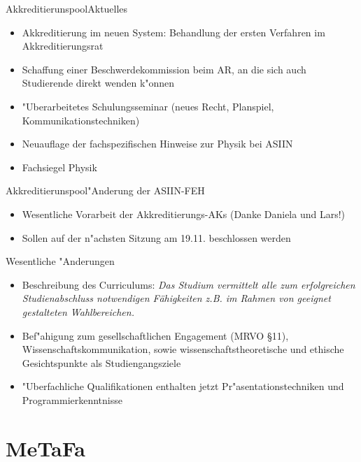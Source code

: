 \documentclass[compress, aspectratio=169]{beamer}
\begin{document}
\begin{frame}{Akkreditierunspool}{Aktuelles}
	\begin{itemize}
		\item Akkreditierung im neuen System: Behandlung der ersten Verfahren im Akkreditierungsrat
		\item Schaffung einer Beschwerdekommission beim AR, an die sich auch Studierende direkt wenden k"onnen
		\item "Uberarbeitetes Schulungsseminar (neues Recht, Planspiel, Kommunikationstechniken)
		\item Neuauflage der fachspezifischen Hinweise zur Physik bei ASIIN
		\item Fachsiegel Physik
	\end{itemize}
\end{frame}

\begin{frame}{Akkreditierunspool}{"Anderung der ASIIN-FEH}
	\begin{itemize}
		\item Wesentliche Vorarbeit der Akkreditierungs-AKs (Danke Daniela und Lars!)
		\item Sollen auf der n"achsten Sitzung am 19.11. beschlossen werden
	\end{itemize}
	\pause
	\begin{block}{Wesentliche "Anderungen}
	\begin{itemize}
		\scriptsize
		\item Beschreibung des Curriculums: \textit{\glqq Das Studium vermittelt alle zum erfolgreichen Studienabschluss notwendigen Fähigkeiten z.B. im Rahmen von geeignet gestalteten Wahlbereichen.\grqq}
		\item Bef"ahigung zum gesellschaftlichen Engagement (MRVO \S 11), Wissenschaftskommunikation, sowie wissenschaftstheoretische und ethische Gesichtspunkte als Studiengangsziele
		\item "Uberfachliche Qualifikationen enthalten jetzt Pr"asentationstechniken und Programmierkenntnisse 
	\end{itemize}		
	\end{block}
\end{frame}

\section{MeTaFa}
\end{document}
